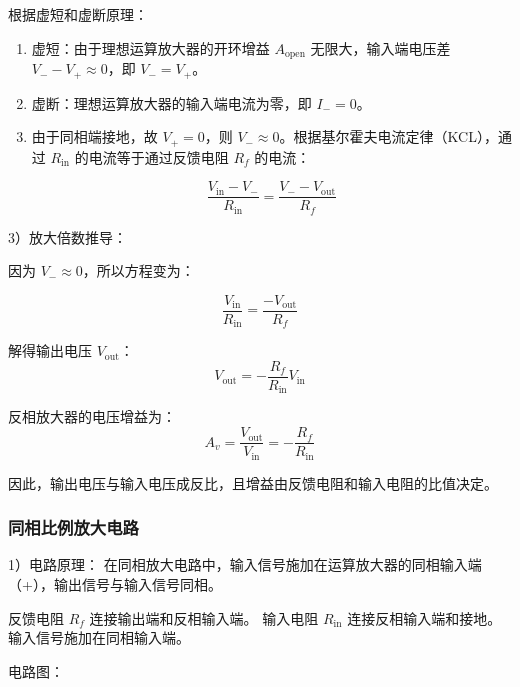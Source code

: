 \documentclass[dvipsnames, svgnames,a4paper,11pt]{article}
\begin{document}
			根据虚短和虚断原理：
			\begin{enumerate}
				\item 虚短：由于理想运算放大器的开环增益 \( A_{\text{open}} \) 无限大，输入端电压差 \( V_- - V_+ \approx 0 \)，即 \( V_- = V_+ \)。
				\item 虚断：理想运算放大器的输入端电流为零，即 \( I_- = 0 \)。
				\item 由于同相端接地，故 \( V_+ = 0 \)，则 \( V_- \approx 0 \)。根据基尔霍夫电流定律（KCL），通过 \( R_{\text{in}} \) 的电流等于通过反馈电阻 \( R_f \) 的电流：

				\begin{equation}
					\frac{V_{\text{in}} - V_-}{R_{\text{in}}} = \frac{V_- - V_{\text{out}}}{R_f}				
					\label{eq:1}
				\end{equation}

			\end{enumerate}

			3）放大倍数推导：
			
			因为 \( V_- \approx 0 \)，所以方程变为：
			
			\begin{equation}
				\frac{V_{\text{in}}}{R_{\text{in}}} = \frac{-V_{\text{out}}}{R_f}			
				\label{eq:2}
			\end{equation}

			解得输出电压 \( V_{\text{out}} \)：
			\begin{equation}
				V_{\text{out}} = - \frac{R_f}{R_{\text{in}}} V_{\text{in}}		
				\label{eq:3}
			\end{equation}

			反相放大器的电压增益为：
			\begin{equation}
				A_v = \frac{V_{\text{out}}}{V_{\text{in}}} = - \frac{R_f}{R_{\text{in}}}	
				\label{eq:4}
			\end{equation}
			
			因此，输出电压与输入电压成反比，且增益由反馈电阻和输入电阻的比值决定。

	\subsubsection{同相比例放大电路}
		1）电路原理：
		在同相放大电路中，输入信号施加在运算放大器的同相输入端（+），输出信号与输入信号同相。
		
		反馈电阻 \( R_f \) 连接输出端和反相输入端。
		输入电阻 \( R_{\text{in}} \) 连接反相输入端和接地。
		输入信号施加在同相输入端。

		电路图：
\end{document}
